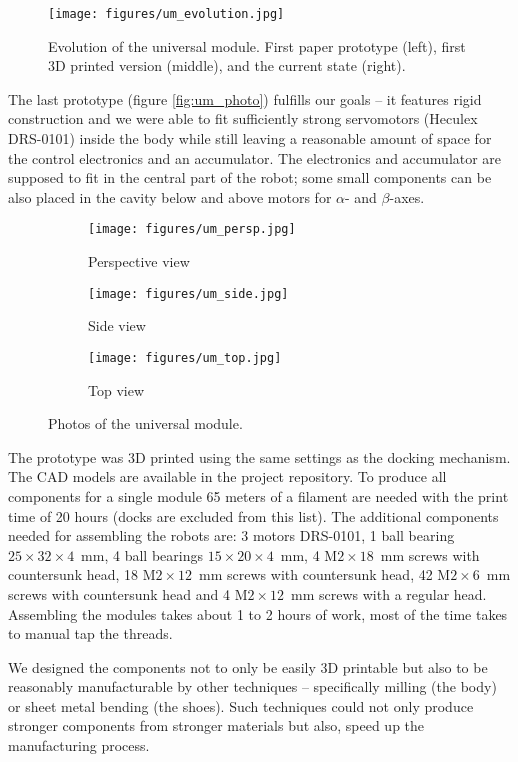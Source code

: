 \begin{figure}[!t]
    \centering
    \texttt{[image: figures/um\_evolution.jpg]}
    \caption{Evolution of the universal module. First paper prototype (left),
    first 3D printed version (middle), and the current state (right).}
    \label{fig:um_evolution}
\end{figure}

The last prototype (figure \ref{fig:um_photo}) fulfills our goals -- it features
rigid construction and we were able to fit sufficiently strong servomotors
(Heculex DRS-0101) inside the body while still leaving a reasonable amount of
space for the control electronics and an accumulator. The electronics and
accumulator are supposed to fit in the central part of the robot; some small
components can be also placed in the cavity below and above motors for $\alpha$-
and $\beta$-axes.

\begin{figure}[!t]
    \centering
    \begin{subfigure}[b]{\textwidth}
        \texttt{[image: figures/um\_persp.jpg]}
        \caption{Perspective view}
    \end{subfigure}

    \begin{subfigure}[b]{\textwidth}
        \texttt{[image: figures/um\_side.jpg]}
        \caption{Side view}
    \end{subfigure}

    \begin{subfigure}[b]{\textwidth}
        \texttt{[image: figures/um\_top.jpg]}
        \caption{Top view}
    \end{subfigure}

    \caption{Photos of the universal module.}
    \label{fig:um_photos}
\end{figure}

The prototype was 3D printed using the same settings as the docking mechanism.
The CAD models are available in the project repository. To produce all
components for a single module 65 meters of a filament are needed with the print
time of 20 hours (docks are excluded from this list). The additional components
needed for assembling the robots are: 3 motors DRS-0101, 1 ball bearing
$25\times32\times4$~mm, 4 ball bearings $15\times20\times4$~mm, 4
M$2\times18$~mm screws with countersunk head, 18 M$2\times12$~mm screws with
countersunk head, 42 M$2\times6$~mm screws with countersunk head and 4
M$2\times12$~mm screws with a regular head. Assembling the modules takes about 1
to 2 hours of work, most of the time takes to manual tap the threads.

We designed the components not to only be easily 3D printable but also to be
reasonably manufacturable by other techniques -- specifically milling (the body)
or sheet metal bending (the shoes). Such techniques could not only produce
stronger components from stronger materials but also, speed up the
manufacturing process.
